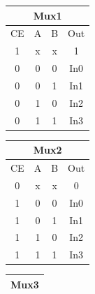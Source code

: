 \begin{center}
    \begin{minipage}{0.3\textwidth}\centering
        \begin{tabular}{|cccc|}
\hline
\multicolumn{4}{|c|}{Mux1}                                                        \\ \hline
\multicolumn{1}{|c|}{CE} & \multicolumn{1}{c|}{A} & \multicolumn{1}{c|}{B} & Out \\ \hline
\multicolumn{1}{|c|}{1}  & \multicolumn{1}{c|}{x} & \multicolumn{1}{c|}{x} & 1   \\ \hline
\multicolumn{1}{|c|}{0}  & \multicolumn{1}{c|}{0} & \multicolumn{1}{c|}{0} & In0 \\ \hline
\multicolumn{1}{|c|}{0}  & \multicolumn{1}{c|}{0} & \multicolumn{1}{c|}{1} & In1 \\ \hline
\multicolumn{1}{|c|}{0}  & \multicolumn{1}{c|}{1} & \multicolumn{1}{c|}{0} & In2 \\ \hline
\multicolumn{1}{|c|}{0}  & \multicolumn{1}{c|}{1} & \multicolumn{1}{c|}{1} & In3 \\ \hline
\end{tabular}
    \end{minipage}
    \begin{minipage}{0.3\textwidth}\centering
\begin{tabular}{|cccc|}
\hline
\multicolumn{4}{|c|}{Mux2}                                                       \\ \hline
\multicolumn{1}{|c|}{CE} & \multicolumn{1}{c|}{A} & \multicolumn{1}{c|}{B} & Out \\ \hline
\multicolumn{1}{|c|}{0}  & \multicolumn{1}{c|}{x} & \multicolumn{1}{c|}{x} & 0   \\ \hline
\multicolumn{1}{|c|}{1}  & \multicolumn{1}{c|}{0} & \multicolumn{1}{c|}{0} & In0 \\ \hline
\multicolumn{1}{|c|}{1}  & \multicolumn{1}{c|}{0} & \multicolumn{1}{c|}{1} & In1 \\ \hline
\multicolumn{1}{|c|}{1}  & \multicolumn{1}{c|}{1} & \multicolumn{1}{c|}{0} & In2 \\ \hline
\multicolumn{1}{|c|}{1}  & \multicolumn{1}{c|}{1} & \multicolumn{1}{c|}{1} & In3 \\ \hline
\end{tabular}
    \end{minipage} 
\begin{minipage}{0.3\textwidth}\centering
\begin{tabular}{|cccc|}
\hline
\multicolumn{4}{|c|}{Mux3}                                                       \\ \hline

\end{tabular}
\end{minipage}
\end{center}
